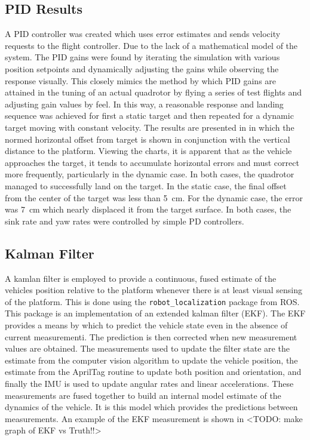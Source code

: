 \subsection{PID Results}
A PID controller was created which uses error estimates and sends velocity requests to the flight controller.
Due to the lack of a mathematical model of the system. The PID gains were found by iterating the simulation
with various position setpoints and dynamically adjusting the gains while observing the response visually.
This closely mimics the method by which PID gains are attained in the tuning of an actual quadrotor by flying
a series of test flights and adjusting gain values by feel. In this way, a reasonable response and landing
sequence was achieved for first a static target and then repeated for a dynamic target moving with constant
velocity. The results are presented in  in which the normed horizontal offset
from target is shown in conjunction with the vertical distance to the platform. Viewing the charts, it is
apparent that as the vehicle approaches the target, it tends to accumulate horizontal errors and must correct
more frequently, particularly in the dynamic case. In both cases, the quadrotor managed to successfully land
on the target. In the static case, the final offset from the center of the target was less than \SI{5}{\cm}.
For the dynamic case, the error was \SI{7}{\cm} which nearly displaced it from the target surface. In both
cases, the sink rate and yaw rates were controlled by simple PD controllers.

\subsection{Kalman Filter}
A kamlan filter is employed to provide a continuous, fused estimate of the vehicles position relative to the
platform whenever there is at least visual sensing of the platform. This is done using the
\verb|robot_localization| package from ROS\cite{MooreStouchKeneralizedEkf2014}. This package is an
implementation of an extended kalman filter (EKF). The EKF provides a means by which to predict the vehicle
state even in the absence of current measurementi\cite{kalman1960new}. The prediction is then corrected when
new measurement values are obtained. The measurements used to update the filter state are the estimate from
the computer vision algorithm to update the vehicle position, the estimate from the
AprilTag\cite{olson2011tags} routine to update both position and orientation, and finally the IMU is used to
update angular rates and linear accelerations. These measurements are fused together to build an internal
model estimate of the dynamics of the vehicle. It is this model which provides the predictions between
measurements. An example of the EKF measurement is shown in <TODO: make graph of EKF vs Truth!!>


